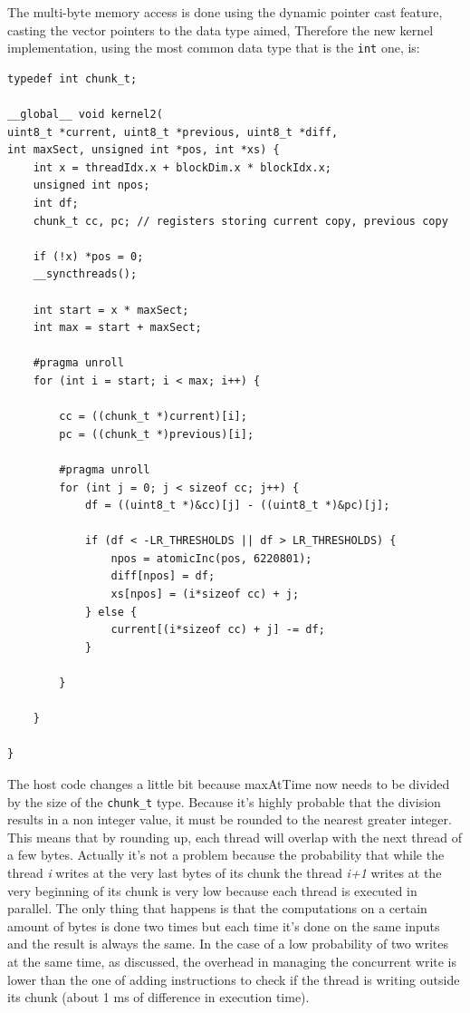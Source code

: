\documentclass[paper=a4, fontsize=10pt]{scrartcl}	%
\begin{document}
	The multi-byte memory access is done using the dynamic pointer cast feature, casting the vector pointers to the data type aimed, Therefore the new kernel implementation, using the most common data type that is the \texttt{int} one, is:

	\begin{lstlisting}[style=CStyle]
typedef int chunk_t;

__global__ void kernel2(
uint8_t *current, uint8_t *previous, uint8_t *diff, 
int maxSect, unsigned int *pos, int *xs) {
    int x = threadIdx.x + blockDim.x * blockIdx.x;
    unsigned int npos;
    int df;
    chunk_t cc, pc; // registers storing current copy, previous copy

    if (!x) *pos = 0;
    __syncthreads();

    int start = x * maxSect;
    int max = start + maxSect;

    #pragma unroll
    for (int i = start; i < max; i++) {

        cc = ((chunk_t *)current)[i];
        pc = ((chunk_t *)previous)[i];

        #pragma unroll
        for (int j = 0; j < sizeof cc; j++) {
            df = ((uint8_t *)&cc)[j] - ((uint8_t *)&pc)[j];

            if (df < -LR_THRESHOLDS || df > LR_THRESHOLDS) {
                npos = atomicInc(pos, 6220801);
                diff[npos] = df;
                xs[npos] = (i*sizeof cc) + j;
            } else {
                current[(i*sizeof cc) + j] -= df;
            }

        }

    }

}
	\end{lstlisting}

	The host code changes a little bit because maxAtTime now needs to be divided by the size of the \texttt{chunk\_t} type. Because it's highly probable that the division results in a non integer value, it must be rounded to the nearest greater integer. \\
	
	This means that by rounding up, each thread will overlap with the next thread of a few bytes. Actually it's not a problem because the probability that while the thread \textit{i} writes at the very last bytes of its chunk the thread \textit{i+1} writes at the very beginning of its chunk is very low because each thread is executed in parallel. The only thing that happens is that the computations on a certain amount of bytes is done two times but each time it's done on the same inputs and the result is always the same. In the case of a low probability of two writes at the same time, as discussed, the overhead in managing the concurrent write is lower than the one of adding instructions to check if the thread is writing outside its chunk (about 1 ms of difference in execution time).\\
\end{document}
